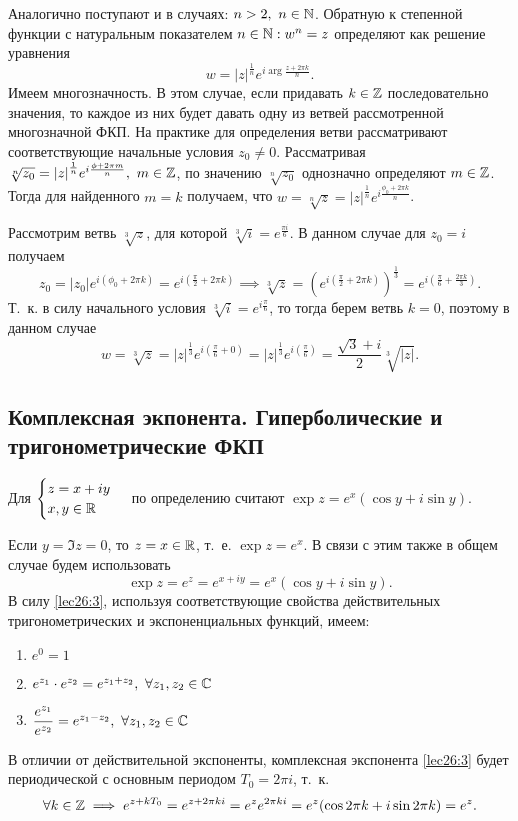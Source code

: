 \documentclass[../../main.tex]{subfiles}
\begin{document}
Аналогично поступают и в случаях: $n > 2,\ n \in \mathbb{N}$.
Обратную к степенной функции с натуральным показателем $n \in \mathbb{N}: w^n = z$
определяют как решение уравнения
\[w = {|z|}^{\textstyle \frac{1}{n}}e^{i\arg\frac{z + 2 \pi k}{n}}.\]
Имеем многозначность. В этом случае, если придавать $k \in \mathbb{Z}$ последовательно
значения, то каждое из них будет давать одну из ветвей рассмотренной
многозначной ФКП. На практике для определения ветви рассматривают 
соответствующие начальные условия 
${z_0 \neq 0}$. Рассматривая $\sqrt[n]{z_0} = {|z|}^{\frac{1}{n}}e^{i
\frac{\phi + 2 \pi m}{n}},\ m \in \mathbb{Z}$, по значению 
$\sqrt[n]{z_0}$ однозначно определяют $m \in \mathbb{Z}$. Тогда для найденного 
$m=k$ получаем, что $w = \sqrt[n]{z} = |z|^{\textstyle 
\frac{1}{n}} e^{i \frac{\phi_0 + 2 \pi k}{n}}$.

\begin{example}
 Рассмотрим ветвь $\sqrt[3]{z}$, для которой 
 $\sqrt[3]{i} = e ^{\textstyle \frac{\pi i}{6}}$. В данном случае для 
 $z_0 = i$ получаем \[z_0 = |z_0| e^{\textstyle i(\phi_0 + 2 \pi k)} = 
 e^{\textstyle i(\frac{\pi}{2} + 2 \pi k)} \implies \sqrt[3]{z} = 
 \left(e^{\textstyle i(\frac{\pi}{2} + 2 \pi k)}\right)^{\textstyle 
 \frac{1}{3}} =
 e^{\textstyle i(\frac{\pi}{6} + \frac{2 \pi k}{3})}.\]
 Т.~к. в силу начального условия 
 $\sqrt[3]{i} = e ^{\textstyle i \frac{\pi}{6}}$, то тогда
 берем ветвь $k = 0$, 
 поэтому в данном случае \[w = \sqrt[3]{z}
 = {|z|}^{\tfrac{1}{3}}e ^{\textstyle i( \frac{\pi}{6} + 0)}
 = {|z|}^{\tfrac{1}{3}}e ^{\textstyle i( \frac{\pi}{6})} 
 = \frac{\sqrt{3} + i }{2} \sqrt[3]{|z|}.\]
\end{example}

\subsection{Комплексная экпонента. Гиперболические и тригонометрические ФКП}
Для 
$
\begin{cases}
 z = x + iy \\
 x, y \in \mathbb{R}
\end{cases}
$
по определению считают $\exp z = e^x(\cos y  + i \sin y) $.

Если $y = \Im z = 0$, то $z = x \in \mathbb{R}$, т.~е.
$\exp z = e^x$.
В связи с этим также в общем случае будем использовать
\begin{equation}
\label{lec26:3}
 \exp z = e^z = e^{x + iy} = e^{x}(\cos y + i \sin y).
\end{equation}
В силу \eqref{lec26:3}, используя соответствующие свойства действительных 
тригонометрических и экспоненциальных функций, имеем:
 \begin{enumerate}
    \item $e^0 = 1$
    \item $e^{z_1} \cdot e^{z_2} = e^{z_1 + z_2},\ \forall z_1, z_2 \in \mathbb{C}$
    \item $\dfrac{e^{z_1}}{e^{z_2}} = e^{z_1 - z_2},\ \forall z_1, z_2 \in \mathbb{C}$
 \end{enumerate}
В отличии от действительной экспоненты, комплексная экспонента \eqref{lec26:3} 
будет 
периодической с основным периодом $T_0 = 2\pi i$, т.~к.
\[\forall k \in \mathbb{Z} \implies e^{z + kT_0} = e^{z + 2 \pi k i} 
= e^{z} e^{2 \pi k i} = e^z(\cos{2 \pi k} + i \sin{2 \pi k}) = e^z.\]
\end{document}
